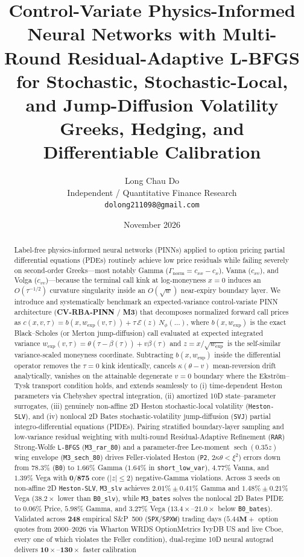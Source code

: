 \documentclass[11pt,a4paper]{article}
\title{\textbf{Control-Variate Physics-Informed Neural Networks with Multi-Round Residual-Adaptive L-BFGS for Stochastic, Stochastic-Local, and Jump-Diffusion Volatility Greeks, Hedging, and Differentiable Calibration}}
\author{Long Chau Do\\
\small Independent / Quantitative Finance Research\\
\small \texttt{dolong211098@gmail.com}}
\date{November 2026}
\begin{document}
\maketitle

\begin{abstract}
Label-free physics-informed neural networks (PINNs) applied to option pricing partial differential equations (PDEs) routinely achieve low price residuals while failing severely on second-order Greeks---most notably Gamma ($\Gamma_{\mathrm{norm}} = c_{xx} - c_x$), Vanna ($c_{xv}$), and Volga ($c_{vv}$)---because the terminal call kink at log-moneyness $x = 0$ induces an $O(\tau^{-1/2})$ curvature singularity inside an $O(\sqrt{w})$ near-expiry boundary layer. We introduce and systematically benchmark an expected-variance control-variate PINN architecture (\textbf{CV-RBA-PINN} / \textbf{M3}) that decomposes normalized forward call prices as $c(x, v, \tau) = b(x, w_{\mathrm{exp}}(v, \tau)) + \tau\,\mathcal{E}(z)\,N_\phi(\dots)$, where $b(x, w_{\mathrm{exp}})$ is the exact Black--Scholes (or Merton jump-diffusion) call evaluated at expected integrated variance $w_{\mathrm{exp}}(v, \tau) = \theta(\tau - \beta(\tau)) + v\beta(\tau)$ and $z = x/\sqrt{w_{\mathrm{exp}}}$ is the self-similar variance-scaled moneyness coordinate. Subtracting $b(x, w_{\mathrm{exp}})$ inside the differential operator removes the $\tau = 0$ kink identically, cancels $\kappa(\theta - v)$ mean-reversion drift analytically, vanishes on the attainable degenerate $v = 0$ boundary where the Ekstr\"om--Tysk transport condition holds, and extends seamlessly to (i) time-dependent Heston parameters via Chebyshev spectral integration, (ii) amortized 10D state--parameter surrogates, (iii) genuinely non-affine 2D Heston stochastic-local volatility (\texttt{Heston-SLV}), and (iv) nonlocal 2D Bates stochastic-volatility jump-diffusion (\texttt{SVJ}) partial integro-differential equations (PIDEs). Pairing stratified boundary-layer sampling and low-variance residual weighting with multi-round Residual-Adaptive Refinement (\texttt{RAR}) Strong-Wolfe \texttt{L-BFGS} (\texttt{M3\_rar\_80}) and a parameter-free Lee-moment $\operatorname{sech}(0.35 z)$ wing envelope (\texttt{M3\_sech\_80}) drives Feller-violated Heston (\texttt{P2}, $2\kappa\theta < \xi^2$) errors down from $78.3\%$ (\texttt{B0}) to $\mathbf{1.66\%}$ Gamma ($1.64\%$ in \texttt{short\_low\_var}), $\mathbf{4.77\%}$ Vanna, and $\mathbf{1.39\%}$ Vega with $\mathbf{0/875}$ core ($|z|\le 2$) negative-Gamma violations. Across 3 seeds on non-affine 2D \texttt{Heston-SLV}, \texttt{M3\_slv} achieves $\mathbf{2.01\% \pm 0.41\%}$ Gamma and $\mathbf{1.48\% \pm 0.21\%}$ Vega ($38.2\times$ lower than \texttt{B0\_slv}), while \texttt{M3\_bates} solves the nonlocal 2D Bates PIDE to $\mathbf{0.06\%}$ Price, $\mathbf{5.98\%}$ Gamma, and $\mathbf{3.27\%}$ Vega ($13.4\times\text{--}21.0\times$ below \texttt{B0\_bates}). Validated across $\mathbf{248}$ empirical S\&P~500 (\texttt{SPX}/\texttt{SPXW}) trading days ($\mathbf{5.44\text{M}+}$ option quotes from 2000--2026 via Wharton WRDS OptionMetrics IvyDB US and live Cboe, every one of which violates the Feller condition), dual-regime 10D neural autograd delivers $\mathbf{10\times\text{--}130\times}$ faster calibration 
\end{abstract}
\end{document}

